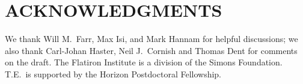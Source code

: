 \documentclass[twocolumn]{aastex631}
\begin{document}


\section{ACKNOWLEDGMENTS}

We thank Will M.~Farr, Max Isi, and Mark Hannam for helpful discussions; we also
thank Carl-Johan Haster, Neil J.~Cornish and Thomas Dent for comments on the
draft. The Flatiron Institute is a division of the Simons Foundation. T.E.\ is
supported by the Horizon Postdoctoral Fellowship.

\end{document}
